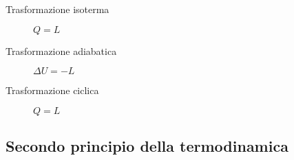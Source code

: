 \documentclass[a4paper,11pt,italian]{article}
\begin{document}
\begin{description}
  \item[Trasformazione isoterma] $ Q = L $%
%
% 

  \item[Trasformazione adiabatica] $ \Delta U = - L $%
%
% 

  \item[Trasformazione ciclica] $ Q = L $%
%
% 
\end{description}

\subsection{Secondo principio della termodinamica}
\end{document}
